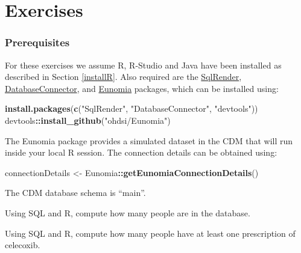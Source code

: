 \documentclass[11pt]{book}
\newenvironment{Shaded}{\begin{snugshade}}{\end{snugshade}}
\newcommand{\KeywordTok}[1]{\textcolor[rgb]{0.13,0.29,0.53}{\textbf{#1}}}
\newcommand{\NormalTok}[1]{#1}
\newcommand{\OperatorTok}[1]{\textcolor[rgb]{0.81,0.36,0.00}{\textbf{#1}}}
\newcommand{\StringTok}[1]{\textcolor[rgb]{0.31,0.60,0.02}{#1}}
\theoremstyle{definition}
\theoremstyle{definition}
\theoremstyle{definition}
\theoremstyle{remark}
\let\BeginKnitrBlock\begin \let\EndKnitrBlock\end
\begin{document}
\hypertarget{exercises-1}{%
\section{Exercises}\label{exercises-1}}

\hypertarget{prerequisites}{%
\subsubsection*{Prerequisites}\label{prerequisites}}

For these exercises we assume R, R-Studio and Java have been installed as described in Section \ref{installR}. Also required are the \href{https://ohdsi.github.io/SqlRender/}{SqlRender}, \href{https://ohdsi.github.io/DatabaseConnector/}{DatabaseConnector}, and \href{https://ohdsi.github.io/Eunomia/}{Eunomia} packages, which can be installed using:

\begin{Shaded}
\begin{Highlighting}[]
\KeywordTok{install.packages}\NormalTok{(}\KeywordTok{c}\NormalTok{(}\StringTok{"SqlRender"}\NormalTok{, }\StringTok{"DatabaseConnector"}\NormalTok{, }\StringTok{"devtools"}\NormalTok{))}
\NormalTok{devtools}\OperatorTok{::}\KeywordTok{install_github}\NormalTok{(}\StringTok{"ohdsi/Eunomia"}\NormalTok{)}
\end{Highlighting}
\end{Shaded}

The Eunomia package provides a simulated dataset in the CDM that will run inside your local R session. The connection details can be obtained using:

\begin{Shaded}
\begin{Highlighting}[]
\NormalTok{connectionDetails <-}\StringTok{ }\NormalTok{Eunomia}\OperatorTok{::}\KeywordTok{getEunomiaConnectionDetails}\NormalTok{()}
\end{Highlighting}
\end{Shaded}

The CDM database schema is ``main''.

\BeginKnitrBlock{exercise}
\protect\hypertarget{exr:exercisePeopleCount}{}{\label{exr:exercisePeopleCount} }Using SQL and R, compute how many people are in the database.
\EndKnitrBlock{exercise}

\BeginKnitrBlock{exercise}
\protect\hypertarget{exr:exerciseCelecoxibUsers}{}{\label{exr:exerciseCelecoxibUsers} }Using SQL and R, compute how many people have at least one prescription of celecoxib.
\EndKnitrBlock{exercise}
\end{document}
